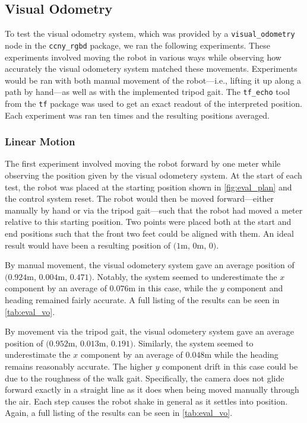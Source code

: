 \subsection{Visual Odometry}

To test the visual odometry system, which was provided by a \texttt{visual\_odometry} node in the \texttt{ccny\_rgbd} package, we ran the following experiments. These experiments involved moving the robot in various ways while observing how accurately the visual odometery system matched these movements. Experiments would be ran with both manual movement of the robot---i.e., lifting it up along a path by hand---as well as with the implemented tripod gait. The \texttt{tf\_echo} tool from the \texttt{tf} package was used to get an exact readout of the interpreted position. Each experiment was ran ten times and the resulting positions averaged.

\subsubsection{Linear Motion}

The first experiment involved moving the robot forward by one meter while observing the position given by the visual odometery system. At the start of each test, the robot was placed at the starting position shown in \autoref{fig:eval_plan} and the control system reset. The robot would then be moved forward---either manually by hand or via the tripod gait---such that the robot had moved a meter relative to this starting position. Two points were placed both at the start and end positions such that the front two feet could be aligned with them. An ideal result would have been a resulting position of $(1$m, $0$m, $0$\textdegree{}$)$.

By manual movement, the visual odometery system gave an average position of $(0.924$m, $0.004$m, $0.471$\textdegree{}$)$. Notably, the system seemed to underestimate the $x$ component by an average of $0.076$m in this case, while the $y$ component and heading remained fairly accurate. A full listing of the results can be seen in \autoref{tab:eval_vo}.

By movement via the tripod gait, the visual odometery system gave an average position of $(0.952$m, $0.013$m, $0.191$\textdegree{}$)$. Similarly, the system seemed to underestimate the $x$ component by an average of $0.048$m while the heading remains reasonably accurate. The higher $y$ component drift in this case could be due to the roughness of the walk gait. Specifically, the camera does not glide forward exactly in a straight line as it does when being moved manually through the air. Each step causes the robot shake in general as it settles into position. Again, a full listing of the results can be seen in \autoref{tab:eval_vo}.

